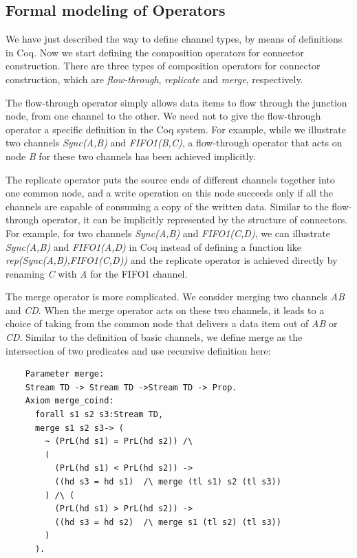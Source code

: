 \documentclass{llncs}
\begin{document}
\subsection{Formal modeling of Operators}
We have just described the way to define channel types, by means of definitions in Coq. Now we start defining the composition operators for connector construction. There are three types of composition operators for connector construction, which are \emph{flow-through}, \emph{replicate} and \emph{merge}, respectively.

The flow-through operator simply allows data items to flow through the junction node, from one channel to the other. We need not to give the flow-through operator a specific definition in the Coq system. For example, while we illustrate two channels \emph{Sync(A,B)} and \emph{FIFO1(B,C)}, a flow-through operator that acts on node \emph{B} for these two channels has been achieved implicitly.

The replicate operator puts the source ends of different channels together into one common node, and a write operation on this node succeeds only if all the channels are capable of consuming a copy of the written data. %
Similar to the flow-through operator, it can be implicitly represented by the structure of connectors. For example, for two channels \emph{Sync(A,B)} and \emph{FIFO1(C,D)}, we can illustrate \emph{Sync(A,B)} and \emph{FIFO1(A,D)} in Coq instead of defining a function like \emph{rep(Sync(A,B),FIFO1(C,D))} and the replicate operator is achieved directly by renaming \emph{C} with \emph{A} for the FIFO1 channel.

The merge operator is more complicated. We consider merging two
channels \emph{AB} and \emph{CD}. When the merge operator acts on
these two channels, it leads to a choice of taking from the common
node that delivers a data item out of \emph{AB} or \emph{CD}.
Similar to the definition of basic channels, we define merge as the intersection of two predicates and use recursive definition here:
\begin{verbatim}
    Parameter merge:
    Stream TD -> Stream TD ->Stream TD -> Prop.
    Axiom merge_coind:
      forall s1 s2 s3:Stream TD,
      merge s1 s2 s3-> (
        ~ (PrL(hd s1) = PrL(hd s2)) /\
        (
          (PrL(hd s1) < PrL(hd s2)) ->
          ((hd s3 = hd s1)  /\ merge (tl s1) s2 (tl s3))
        ) /\ (
          (PrL(hd s1) > PrL(hd s2)) ->
          ((hd s3 = hd s2)  /\ merge s1 (tl s2) (tl s3))
        )
      ).
\end{verbatim}
\end{document}
